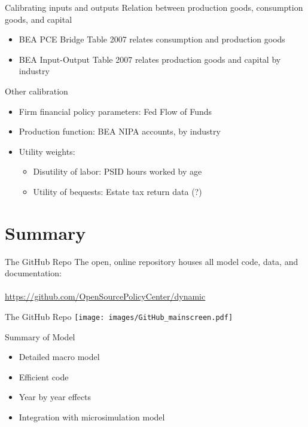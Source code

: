 \documentclass{beamer}
\begin{document}
  \begin{frame}{Calibrating inputs and outputs}
  Relation between production goods, consumption goods, and capital
  \begin{itemize}
  \item BEA PCE Bridge Table 2007 relates consumption and production goods
  \item BEA Input-Output Table 2007 relates production goods and capital by industry
  \end{itemize}
  \end{frame}

  \begin{frame}{Other calibration}
  \begin{itemize}
  \item Firm financial policy parameters: Fed Flow of Funds
  \item Production function: BEA NIPA accounts, by industry
  \item Utility weights:
  	\begin{itemize}
  	\item Disutility of labor: PSID hours worked by age
  	\item Utility of bequests: Estate tax return data (?)
  	\end{itemize}
  \end{itemize}
  \end{frame}

\section{Summary}

  \begin{frame}{The GitHub Repo}
    The open, online repository houses all model code, data, and documentation: \\
    \ \\
    \href{https://github.com/OpenSourcePolicyCenter/dynamic}{https://github.com/OpenSourcePolicyCenter/dynamic}
  \end{frame}


  \begin{frame}{The GitHub Repo}
    \texttt{[image: images/GitHub\_mainscreen.pdf]}
  \end{frame}

  \begin{frame}{Summary of Model}
    \begin{itemize}
      \item Detailed macro model
      \item Efficient code
      \item Year by year effects
      \item Integration with microsimulation model
    \end{itemize}
  \end{frame}
\end{document}
